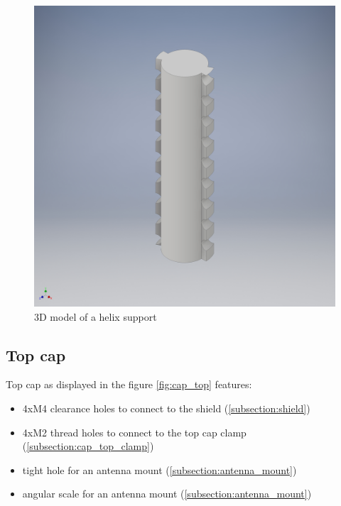 \begin{figure}[h]
	\centering
	\includegraphics[width=\textwidth]{images/coil_support}
	\caption{3D model of a helix support}
	\label{fig:helix_support}
\end{figure}

\clearpage
\subsection{Top cap}
\label{subsection:cap_top}
Top cap as displayed in the figure \ref{fig:cap_top} features:
\begin{itemize}
	\item 4xM4 clearance holes to connect to the shield (\ref{subsection:shield})
	\item 4xM2 thread holes to connect to the top cap clamp (\ref{subsection:cap_top_clamp})
	\item tight hole for an antenna mount (\ref{subsection:antenna_mount})
	\item angular scale for an antenna mount (\ref{subsection:antenna_mount})
\end{itemize}

